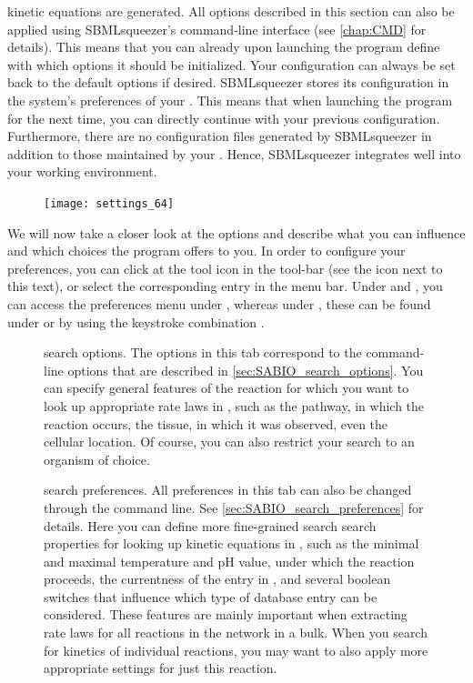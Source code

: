 kinetic equations are generated.
All options described in this section can also be applied using SBMLsqueezer's
command-line interface (see \vref{chap:CMD} for details).
This means that you can already upon launching the program define with which
options it should be initialized.
Your configuration can always be set back to the default options if desired.
SBMLsqueezer stores its configuration in the system's preferences of your \OS.
This means that when launching the program for the next time, you can directly
continue with your previous configuration.
Furthermore, there are no configuration files generated by SBMLsqueezer in
addition to those maintained by your \OS.
Hence, SBMLsqueezer integrates well into your working environment.

\begin{figure}
\vspace{\wrapfigspace}
\texttt{[image: settings\_64]}
\end{figure}
We will now take a closer look at the options and describe what you can influence
and which choices the program offers to you.
In order to configure your preferences, you can click at the tool icon in the
tool-bar (see the icon next to this text), or select the corresponding entry in the menu bar.
Under \Windows and \Linux, you can access the preferences menu under
, whereas
under \MacOSX, these can be found under  or by using the keystroke
combination \keys{\cmd + {$,$}}.
\begin{figure}
\caption[\SABIO search options]{\SABIO search options.
The options in this tab correspond to the command-line options that are described
in \vref{sec:SABIO_search_options}.
You can specify general features of the reaction for which you want to look up
appropriate rate laws in \SABIO, such as the pathway, in which the reaction
occurs, the tissue, in which it was observed, even the cellular location.
Of course, you can also restrict your search to an organism of choice.}
\label{fig:SABIO-RK_search_options}
\end{figure}
\begin{figure}
\caption[\SABIO search preferences]{\SABIO search preferences.
All preferences in this tab can also be changed through the command line.
See \vref{sec:SABIO_search_preferences} for details.
Here you can define more fine-grained search search properties for looking up
kinetic equations in \SABIO, such as the minimal and maximal temperature and
pH value, under which the reaction proceeds, the currentness of the entry in
\SABIO, and several boolean switches that influence which type of database entry
can be considered.
These features are mainly important when extracting rate laws for all reactions
in the network in a bulk.
When you search for kinetics of individual reactions, you may want to also apply
more appropriate settings for just this reaction.}
\label{fig:SABIO-RK_search_preferences}
\end{figure}

